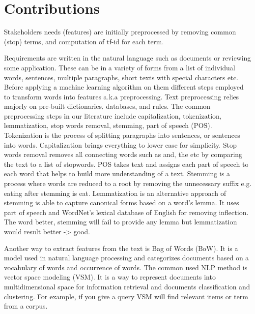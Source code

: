 \section{Contributions}

 Stakeholders needs
(features) are initially preprocessed
by removing common (stop) terms, and computation of tf-id  for each term.

Requirements are written in the natural language such as documents or reviewing some application. These can be in a variety of forms from a list of individual words, sentences, multiple paragraphs, short texts with special characters etc. Before applying a machine learning algorithm on them different steps employed to transform words into features a.k.a preprocessing. Text preprocessing relies majorly on pre-built dictionaries, databases, and rules. The common preprocessing steps in our literature include capitalization, tokenization, lemmatization, stop words removal, stemming, part of speech (POS). Tokenization is the process of splitting paragraphs into sentences, or sentences into words. Capitalization brings everything to lower case for simplicity. Stop words removal removes all connecting words such as and, the etc by comparing the text to a list of stopwords. POS takes text and assigns each part of speech to each word that helps to build more understanding of a text. Stemming is a process where words are reduced to a root by removing the unnecessary suffix e.g. eating after stemming is eat. Lemmatization is an alternative approach of stemming is able to capture canonical forms based on a word's lemma. It uses part of speech and  WordNet’s lexical database of English for removing inflection. The word better, stemming will fail to provide any lemma but lemmatization would result better -> good. 

 Another way to extract features from the text is Bag of Words (BoW). It is a model used in natural language processing and categorizes documents based on a vocabulary of words and occurrence of words. The common used NLP method is vector space modeling (VSM). It is a way to represent documents into multidimensional space for information retrieval and documents classification and clustering. For example, if you give a query VSM will find relevant items or term from a corpus.


